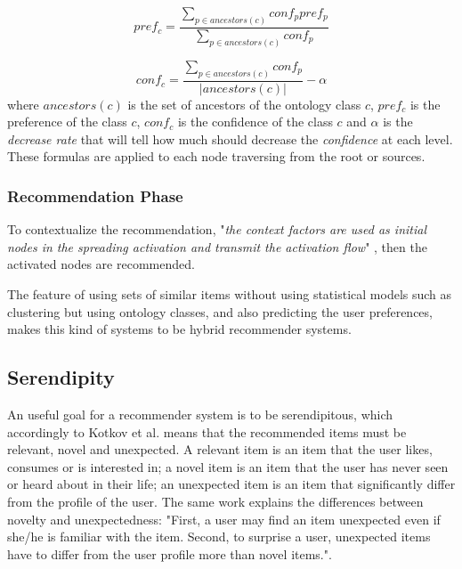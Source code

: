 \begin{equation} \label{eq:preference}
    pref_c = \frac{\displaystyle \sum_{p \in ancestors(c)}{conf_p pref_p}}
                    {\displaystyle  \sum_{p \in ancestors(c)} {conf_p}}
\end{equation}

\begin{equation} \label{eq:confidence}
    conf_c = \frac{\displaystyle \sum_{p \in ancestors(c)} {conf_p}}{|ancestors(c)|} - \alpha
\end{equation}
where $ancestors(c)$ is the set of ancestors of the ontology class $c$, $pref_c$ is the preference of the class $c$, $conf_c$ is the confidence of the class $c$ and $\alpha$ is the \textit{decrease rate} that will tell how much should decrease the \textit{confidence} at each level. These formulas are applied to each node traversing from the root or sources.

\subsubsection{Recommendation Phase}
To contextualize the recommendation, "\textit{the context factors are used as initial nodes in the spreading activation and transmit the activation flow}" \cite{bahramian_abbaspour_claramunt_2017}, then the activated nodes are recommended. 

The feature of using sets of similar items without using statistical models such as clustering but using ontology classes, and also predicting the user preferences, makes this kind of systems to be hybrid recommender systems.

\subsection{Serendipity} \label{section:serendipity}
An useful goal for a recommender system is to be serendipitous, which accordingly to Kotkov et al. \cite{kotkov2016survey} means that the recommended items must be relevant, novel and unexpected. A relevant item is an item that the user likes, consumes or is interested in; a novel item is an item that the user has never seen or heard about in their life; an unexpected item is an item that significantly differ from the profile of the user. The same work explains the differences between novelty and unexpectedness: "First, a user may find an item unexpected even if she/he is familiar with the item. Second, to surprise a user, unexpected items have to differ from the user profile more than novel items.".

